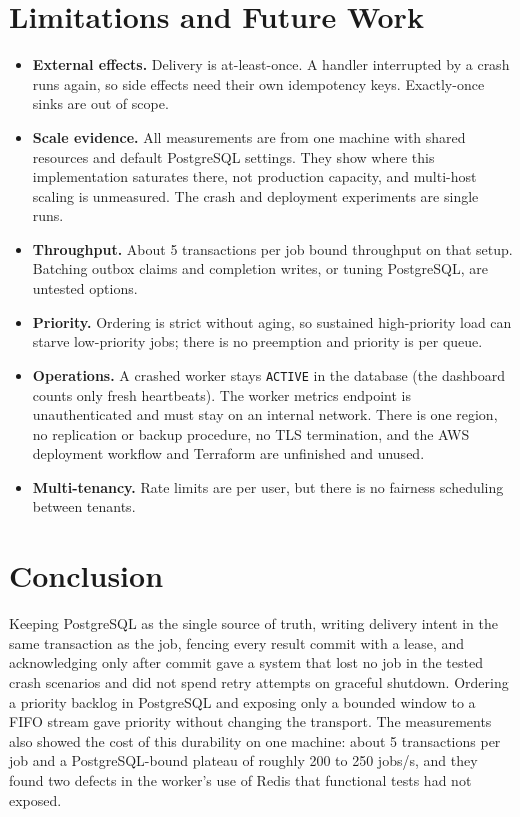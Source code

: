 \documentclass[conference]{IEEEtran}
\newcommand{\code}[1]{\texttt{\small #1}}
\begin{document}
\section{Limitations and Future Work}
\begin{itemize}
  \item \textbf{External effects.} Delivery is at-least-once. A handler interrupted by a crash runs again, so side effects need their own idempotency keys. Exactly-once sinks are out of scope.
  \item \textbf{Scale evidence.} All measurements are from one machine with shared resources and default PostgreSQL settings. They show where this implementation saturates there, not production capacity, and multi-host scaling is unmeasured. The crash and deployment experiments are single runs.
  \item \textbf{Throughput.} About 5 transactions per job bound throughput on that setup. Batching outbox claims and completion writes, or tuning PostgreSQL, are untested options.
  \item \textbf{Priority.} Ordering is strict without aging, so sustained high-priority load can starve low-priority jobs; there is no preemption and priority is per queue.
  \item \textbf{Operations.} A crashed worker stays \code{ACTIVE} in the database (the dashboard counts only fresh heartbeats). The worker metrics endpoint is unauthenticated and must stay on an internal network. There is one region, no replication or backup procedure, no TLS termination, and the AWS deployment workflow and Terraform are unfinished and unused.
  \item \textbf{Multi-tenancy.} Rate limits are per user, but there is no fairness scheduling between tenants.
\end{itemize}

\section{Conclusion}
Keeping PostgreSQL as the single source of truth, writing delivery intent in the same transaction as the job, fencing every result commit with a lease, and acknowledging only after commit gave a system that lost no job in the tested crash scenarios and did not spend retry attempts on graceful shutdown. Ordering a priority backlog in PostgreSQL and exposing only a bounded window to a FIFO stream gave priority without changing the transport. The measurements also showed the cost of this durability on one machine: about 5 transactions per job and a PostgreSQL-bound plateau of roughly 200 to 250 jobs/s, and they found two defects in the worker's use of Redis that functional tests had not exposed.



\end{document}

